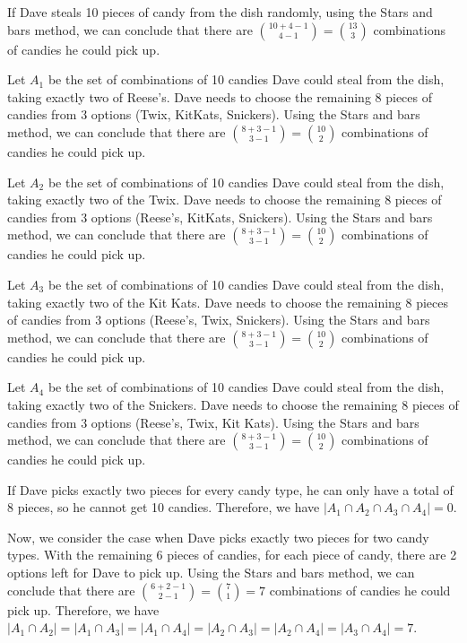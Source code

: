 \documentclass[10pt]{article}
\begin{document}
\begin{enumerate}
If Dave steals 10 pieces of candy from the dish randomly, using the Stars and bars method, we can conclude that there are $\binom{10+4-1}{4-1} = \binom{13}{3}$ combinations of candies he could pick up. 

Let $A_1$ be the set of combinations of 10 candies Dave could steal from the dish, taking exactly two of Reese's. Dave needs to choose the remaining $8$ pieces of candies from $3$ options (Twix, KitKats, Snickers). Using the Stars and bars method, we can conclude that there are $\binom{8+3-1}{3-1} = \binom{10}{2}$ combinations of candies he could pick up. 

Let $A_2$ be the set of combinations of 10 candies Dave could steal from the dish, taking exactly two of the Twix. Dave needs to choose the remaining $8$ pieces of candies from $3$ options (Reese's, KitKats, Snickers). Using the Stars and bars method, we can conclude that there are $\binom{8+3-1}{3-1} = \binom{10}{2}$ combinations of candies he could pick up. 

Let $A_3$ be the set of combinations of 10 candies Dave could steal from the dish, taking exactly two of the Kit Kats. Dave needs to choose the remaining $8$ pieces of candies from $3$ options (Reese's, Twix, Snickers). Using the Stars and bars method, we can conclude that there are $\binom{8+3-1}{3-1} = \binom{10}{2}$ combinations of candies he could pick up. 

Let $A_4$ be the set of combinations of 10 candies Dave could steal from the dish, taking exactly two of the Snickers. Dave needs to choose the remaining $8$ pieces of candies from $3$ options (Reese's, Twix, Kit Kats). Using the Stars and bars method, we can conclude that there are $\binom{8+3-1}{3-1} = \binom{10}{2}$ combinations of candies he could pick up. 

If Dave picks exactly two pieces for every candy type, he can only have a total of 8 pieces, so he cannot get 10 candies. Therefore, we have $| A_1 \cap A_2 \cap A_3 \cap A_4 | = 0$.

Now, we consider the case when Dave picks exactly two pieces for two candy types. With the remaining 6 pieces of candies, for each piece of candy, there are 2 options left for Dave to pick up. Using the Stars and bars method, we can conclude that there are $\binom{6+2-1}{2-1} = \binom{7}{1} = 7$ combinations of candies he could pick up. Therefore, we have $| A_1 \cap A_2 | = | A_1 \cap A_3 | = | A_1 \cap A_4 | = | A_2 \cap A_3 | = | A_2 \cap A_4 | = | A_3 \cap A_4 | = 7$.


\end{enumerate}
\end{document}
